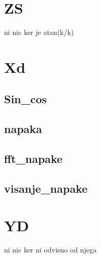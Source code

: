 \section{ZS}
ni nic ker je atan(k/k)
\section{Xd}
\subsection{Sin\_cos}
\subsection{napaka}
\subsection{fft\_napake}
\subsection{visanje\_napake}    

\section{YD}
ni nic ker ni odvisno od njega